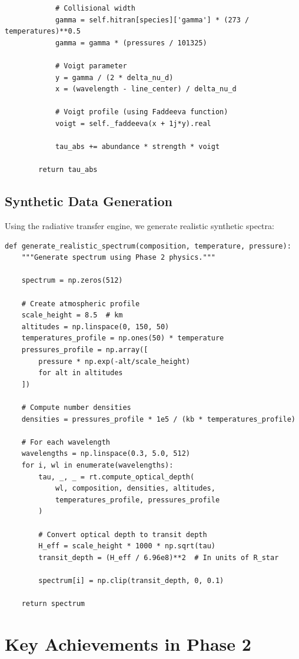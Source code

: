 \documentclass[12pt,a4paper,oneside]{report}
\begin{document}
\begin{lstlisting}
            # Collisional width
            gamma = self.hitran[species]['gamma'] * (273 / temperatures)**0.5
            gamma = gamma * (pressures / 101325)

            # Voigt parameter
            y = gamma / (2 * delta_nu_d)
            x = (wavelength - line_center) / delta_nu_d

            # Voigt profile (using Faddeeva function)
            voigt = self._faddeeva(x + 1j*y).real

            tau_abs += abundance * strength * voigt

        return tau_abs
\end{lstlisting}

\subsection{Synthetic Data Generation}

Using the radiative transfer engine, we generate realistic synthetic spectra:

\begin{lstlisting}
def generate_realistic_spectrum(composition, temperature, pressure):
    """Generate spectrum using Phase 2 physics."""

    spectrum = np.zeros(512)

    # Create atmospheric profile
    scale_height = 8.5  # km
    altitudes = np.linspace(0, 150, 50)
    temperatures_profile = np.ones(50) * temperature
    pressures_profile = np.array([
        pressure * np.exp(-alt/scale_height)
        for alt in altitudes
    ])

    # Compute number densities
    densities = pressures_profile * 1e5 / (kb * temperatures_profile)

    # For each wavelength
    wavelengths = np.linspace(0.3, 5.0, 512)
    for i, wl in enumerate(wavelengths):
        tau, _, _ = rt.compute_optical_depth(
            wl, composition, densities, altitudes,
            temperatures_profile, pressures_profile
        )

        # Convert optical depth to transit depth
        H_eff = scale_height * 1000 * np.sqrt(tau)
        transit_depth = (H_eff / 6.96e8)**2  # In units of R_star

        spectrum[i] = np.clip(transit_depth, 0, 0.1)

    return spectrum
\end{lstlisting}

\section{Key Achievements in Phase 2}
\end{document}
